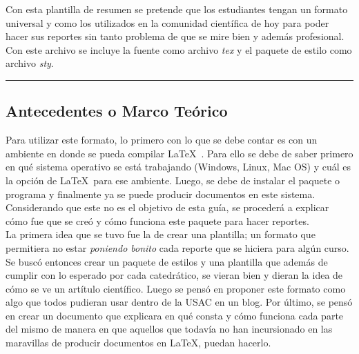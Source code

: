 \documentclass[10pt,letterpaper]{article}
\begin{document}
\thispagestyle{fancy}


\begin{Resumen}
Con esta plantilla de resumen se pretende que los estudiantes tengan un formato universal y como los utilizados en la comunidad cient\'ifica de hoy para poder hacer sus reportes sin tanto problema de que se mire bien y adem\'as profesional. Con este archivo se incluye la fuente como archivo \emph{tex} y el paquete de estilo como archivo \emph{sty}.
\end{Resumen}

\noindent \rule{\linewidth}{0.1mm}

\setlength{\columnsep}{20pt}
\begin{multicols}{2}

\section*{Antecedentes o Marco Te\'orico}
Para utilizar este formato, lo primero con lo que se debe contar es con un ambiente en donde se pueda compilar \LaTeX\ . Para ello se debe de saber primero en qu\'e sistema operativo se est\'a trabajando (Windows, Linux, Mac OS) y cu\'al es la opci\'on de \LaTeX\ para ese ambiente. Luego, se debe de instalar el paquete o programa y finalmente ya se puede producir documentos en este sistema. Considerando que este no es el objetivo de esta gu\'ia, se proceder\'a a explicar c\'omo fue que se cre\'o y c\'omo funciona este paquete para hacer reportes.\\

La primera idea que se tuvo fue la de crear una plantilla; un formato que permitiera no estar \emph{poniendo bonito} cada reporte que se hiciera para alg\'un curso. Se busc\'o entonces crear un paquete de estilos y una plantilla que adem\'as de cumplir con lo esperado por cada catedr\'atico, se vieran bien y dieran la idea de c\'omo se ve un art\'itulo cient\'ifico. Luego se pens\'o en proponer este formato como algo que todos pudieran usar dentro de la USAC en un blog. Por \'ultimo, se pens\'o en crear un documento que explicara en qu\'e consta y c\'omo funciona cada parte del mismo de manera en que aquellos que todav\'ia no han incursionado en las maravillas de producir documentos en \LaTeX , puedan hacerlo.


\end{multicols}
\end{document}
